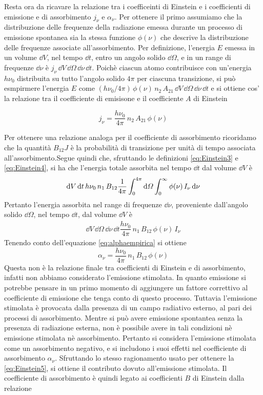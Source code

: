 Resta ora da ricavare la relazione tra i coefficeinti di Einstein e i coefficienti di emissione e di assorbimento $j_\nu$ e $\alpha_\nu$. Per ottenere il primo assumiamo che la distribuzione delle frequenze della radiazione emessa durante un processo di emissione spontanea sia la stessa funzione $\phi(\nu)$ che descrive la distribuzione delle frequenze associate all'assorbimento. Per definizione, l'energia $E$ emessa in un volume $\dd V$, nel tempo $\dd t$, entro un angolo solido $\dd \Omega$, e in un range di frequenze $\dd \nu$ è $j_\nu\,\dd V\, \dd\Omega\,\dd\nu\,\dd t$. Poichè ciascun atomo contribuisce  con un'energia $h\nu_0$ distribuita su tutto l'angolo solido $4\pi$ per ciascuna transizione, si può esmpirmere l'energia $E$ come $(h\nu_0/4\pi)\,\phi(\nu)\,n_2\,A_{21}\,\dd V\, \dd\Omega\,\dd\nu\,\dd t$ e si ottiene cos' la relazione tra il coefficiente di emisisone e il coefficiente $A$ di Einstein
\begin{EQ}
\begin{equation}
j_\nu = \dfrac{h\nu_0}{4\pi}\,n_2\,A_{21}\,\phi(\nu)
\end{equation}
\end{EQ}
Per ottenere una relazione analoga per il coefficiente di assorbimento ricoridamo che la quantità $B_{12}J$ è la probabilità di transizione per unità di tempo associata all'assorbimento.Segue quindi che, sfruttando le definizioni \ref{eq:Einstein3} e \ref{eq:Einstein4}, si ha che l'energia totale assorbita nel tempo $\dd t$ dal volume $\dd V$ è 
\begin{align*}
\mathrm{d} V\,\mathrm{d} t \, h\nu_0\,n_1\,B_{12}\dfrac{1}{4\pi} \int_0^{4\pi} \mathrm{d} \Omega \int_0^\infty \phi(\nu)\,I_\nu \, \mathrm{d}\nu
\end{align*}
Pertanto l'energia assorbita nel range di frequenze $\dd\nu$, proveniente dall'angolo solido $\dd\Omega$, nel tempo $\dd t$, dal volume $\dd V$ è 
\begin{align*}
\dd V\, \dd\Omega\,\dd\nu\,\dd t \dfrac{h\nu_0}{4\pi}\,n_1\,B_{12} \,\phi(\nu)\,I_\nu
\end{align*}
Tenendo conto dell'equazione \ref{eq:alphaempirica}  si ottiene
\begin{equation}
\alpha_\nu = \dfrac{h\nu_0}{4\pi} \, n_1\, B_{12}\,\phi(\nu) \label{eq:Einstein5}
\end{equation}
Questa non è la relazione finale tra coefficienti di Einstein  e di assorbimento, infatti non abbiamo considerato l'emissione stimolata. In quanto emissione si potrebbe pensare in un primo momento di aggiungere un fattore correttivo al coefficiente di emissione che tenga conto di questo processo. Tuttavia l'emissione stimolata è provocata dalla presenza di un campo radiativo esterno, al pari dei processi di assorbimento. Mentre si può avere emissione spontantea senza la presenza di radiazione esterna, non è possibile avere in tali condizioni nè emissione stimolata nè assorbimento. Pertanto si considera l'emissione stimolata come un assorbimento negativo, e si includono i suoi effetti nel coefficiente di assorbimento $\alpha_\nu$. Sfruttando lo stesso ragionamento usato per ottenere la \ref{eq:Einstein5}, si ottiene il contributo dovuto all'emissione stimolata. Il coefficiente di assorbimento è quindi legato ai coefficienti $B$ di Einstein dalla relazione
